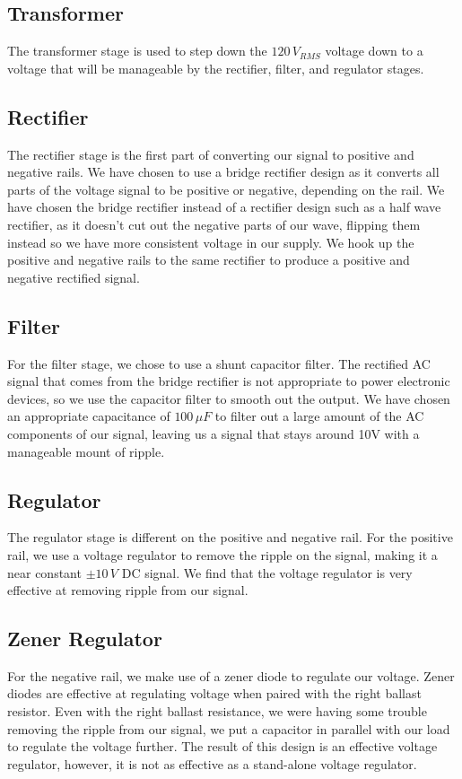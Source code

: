\documentclass[12pt]{article}
\begin{document}
\subsection{Transformer}
The transformer stage is used to step down the $120\,V_{RMS}$ voltage down to a voltage that will be manageable by the rectifier, filter, and regulator stages.

\subsection{Rectifier}
The rectifier stage is the first part of converting our signal to positive and negative rails. We have chosen to use a bridge rectifier design as it converts all parts of the voltage signal 
to be positive or negative, depending on the rail. We have chosen the bridge rectifier instead of a rectifier design such as a half wave rectifier, as it doesn't cut out 
the negative parts of our wave, flipping them instead so we have more consistent voltage in our supply. We hook up the positive and negative rails to the same rectifier to produce a 
positive and negative rectified signal.

\subsection{Filter}
For the filter stage, we chose to use a shunt capacitor filter. The rectified AC signal that comes from the bridge rectifier is not appropriate to power electronic devices, so 
we use the capacitor filter to smooth out the output. We have chosen an appropriate capacitance of $100\,\mu F$ to filter out a large amount of the AC components of our signal, leaving us a 
signal that stays around 10V with a manageable mount of ripple.

\subsection{Regulator}
The regulator stage is different on the positive and negative rail. For the positive rail, we use a voltage regulator to remove the ripple on the signal, making it a 
near constant $\pm10\,V$ DC signal. We find that the voltage regulator is very effective at removing ripple from our signal.

\subsection{Zener Regulator}
For the negative rail, we make use of a zener diode to regulate our voltage. Zener diodes are effective at regulating voltage when paired with the right ballast resistor. Even 
with the right ballast resistance, we were having some trouble removing the ripple from our signal, we put a capacitor in parallel with our load to regulate the voltage further. 
The result of this design is an effective voltage regulator, however, it is not as effective as a stand-alone voltage regulator.
\end{document}
